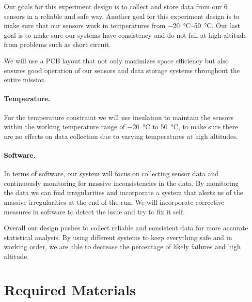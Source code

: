 \documentclass{article}
\begin{document}
Our goals for this experiment design is to collect and store data from our 6 sensors in a reliable and safe way. Another goal for this experiment design is to make sure that our sensors work in temperatures from \SIrange{-20}{50}{\celsius}. Our last goal is to make sure our systems have consistency and do not fail at high altitude from problems such as short circuit.

We will use a PCB layout that not only maximizes space efficiency but also ensures good operation of our sensors and data storage systems throughout the entire mission.

\paragraph{Temperature.} For the temperature constraint we will use insulation to maintain the sensors within the working temperature range of \SI{-20}{\celsius} to \SI{50}{\celsius}, to make sure there are no effects on data collection due to varying temperatures at high altitudes.

\paragraph{Software.} In terms of software, our system will focus on collecting sensor data and continuously monitoring for massive inconsistencies in the data. By monitoring the data we can find irregularities and incorporate a system that alerts us of the massive irregularities at the end of the run. We will incorporate corrective measures in software to detect the issue and try to fix it self.

Overall our design pushes to collect reliable and consistent data for more accurate statistical analysis. By using different systems to keep everything safe and in working order, we are able to decrease the percentage of likely failures and high altitude.

\section{Required Materials}
\end{document}
